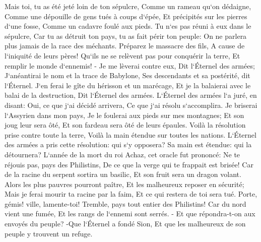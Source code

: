 \verse Mais toi, tu as été jeté loin de ton sépulcre, Comme un rameau qu`on dédaigne, Comme une dépouille de gens tués à coups d`épée, Et précipités sur les pierres d`une fosse, Comme un cadavre foulé aux pieds. 
\verse Tu n`es pas réuni à eux dans le sépulcre, Car tu as détruit ton pays, tu as fait périr ton peuple: On ne parlera plus jamais de la race des méchants. 
\verse Préparez le massacre des fils, A cause de l`iniquité de leurs pères! Qu`ils ne se relèvent pas pour conquérir la terre, Et remplir le monde d`ennemis! - 
\verse Je me lèverai contre eux, Dit l`Éternel des armées; J`anéantirai le nom et la trace de Babylone, Ses descendants et sa postérité, dit l`Éternel. 
\verse J`en ferai le gîte du hérisson et un marécage, Et je la balaierai avec le balai de la destruction, Dit l`Éternel des armées. 
\verse L`Éternel des armées l`a juré, en disant: Oui, ce que j`ai décidé arrivera, Ce que j`ai résolu s`accomplira. 
\verse Je briserai l`Assyrien dans mon pays, Je le foulerai aux pieds sur mes montagnes; Et son joug leur sera ôté, Et son fardeau sera ôté de leurs épaules. 
\verse Voilà la résolution prise contre toute la terre, Voilà la main étendue sur toutes les nations. 
\verse L`Éternel des armées a pris cette résolution: qui s`y opposera? Sa main est étendue: qui la détournera? 
\verse L`année de la mort du roi Achaz, cet oracle fut prononcé: 
\verse Ne te réjouis pas, pays des Philistins, De ce que la verge qui te frappait est brisée! Car de la racine du serpent sortira un basilic, Et son fruit sera un dragon volant. 
\verse Alors les plus pauvres pourront paître, Et les malheureux reposer en sécurité; Mais je ferai mourir ta racine par la faim, Et ce qui restera de toi sera tué. 
\verse Porte, gémis! ville, lamente-toi! Tremble, pays tout entier des Philistins! Car du nord vient une fumée, Et les rangs de l`ennemi sont serrés. - 
\verse Et que répondra-t-on aux envoyés du peuple? -Que l`Éternel a fondé Sion, Et que les malheureux de son peuple y trouvent un refuge. 

